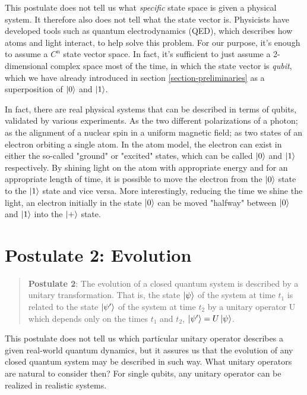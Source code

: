 This postulate does not tell us what \textit{specific} state space is given a physical system. It therefore also does not tell what the state vector is. Physicists have developed tools such as quantum electrodynamics (QED), which describes how atoms and light interact, to help solve this problem. For our purpose, it's enough to assume a $C^n$ state vector space. In fact, it's sufficient to just assume a 2-dimensional complex space most of the time, in which the state vector is \textit{qubit}, which we have already introduced in section \ref{section-preliminaries} as a superposition of $\ket{0}$ and $\ket{1}$.

In fact, there are real physical systems that can be described in terms of qubits, validated by various experiments. As the two different polarizations of a photon; as the alignment of a nuclear spin in a uniform magnetic field; as two states of an electron orbiting a single atom. In the atom model, the electron can exist in either the so-called "ground" or "excited" states, which can be called $\ket{0}$ and $\ket{1}$ respectively. By shining light on the atom with appropriate energy and for an appropriate length of time, it is possible to move the electron from the $\ket{0}$ state to the $\ket{1}$ state and vice versa. More interestingly, reducing the time we shine the light, an electron initially in the state $\ket{0}$ can be moved "halfway" between $\ket{0}$ and $\ket{1}$ into the $\ket{+}$ state\cite{Nielsen}.

\section{Postulate 2: Evolution}

\begin{quote}
    \textbf{Postulate 2}: The evolution of a closed quantum system is described by a unitary transformation. That is, the state $\ket{\psi}$ of the system at time $t_1$ is related to the state $\ket{\psi'}$ of the system at time $t_2$ by a unitary operator U which depends only on the times $t_1$ and $t_2$, $\ket{\psi'}=U\ket{\psi}$.
\end{quote}

This postulate does not tell us which particular unitary operator describes a given real-world quantum dynamics, but it assures us that the evolution of any closed quantum system may be described in such way. What unitary operators are natural to consider then? For single qubits, any unitary operator can be realized in realistic systems. 

